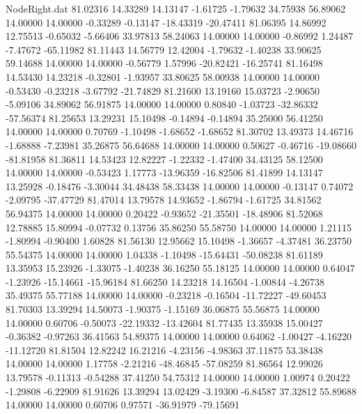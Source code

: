 \begin{filecontents}{NodeRight.dat}
  81.02316   14.33289   14.13147    -1.61725   -1.79632   34.75938   56.89062   14.00000   14.00000   -0.33289   -0.13147  -18.43319  -20.47411
  81.06395   14.86992   12.75513    -0.65032   -5.66406   33.97813   58.24063   14.00000   14.00000   -0.86992    1.24487   -7.47672  -65.11982
  81.11443   14.56779   12.42004    -1.79632   -1.40238   33.90625   59.14688   14.00000   14.00000   -0.56779    1.57996  -20.82421  -16.25741
  81.16498   14.53430   14.23218    -0.32801   -1.93957   33.80625   58.00938   14.00000   14.00000   -0.53430   -0.23218   -3.67792  -21.74829
  81.21600   13.19160   15.03723    -2.90650   -5.09106   34.89062   56.91875   14.00000   14.00000    0.80840   -1.03723  -32.86332  -57.56374
  81.25653   13.29231   15.10498    -0.14894   -0.14894   35.25000   56.41250   14.00000   14.00000    0.70769   -1.10498   -1.68652   -1.68652
  81.30702   13.49373   14.46716    -1.68888   -7.23981   35.26875   56.64688   14.00000   14.00000    0.50627   -0.46716  -19.08660  -81.81958
  81.36811   14.53423   12.82227    -1.22332   -1.47400   34.43125   58.12500   14.00000   14.00000   -0.53423    1.17773  -13.96359  -16.82506
  81.41899   14.13147   13.25928    -0.18476   -3.30044   34.48438   58.33438   14.00000   14.00000   -0.13147    0.74072   -2.09795  -37.47729
  81.47014   13.79578   14.93652    -1.86794   -1.61725   34.81562   56.94375   14.00000   14.00000    0.20422   -0.93652  -21.35501  -18.48906
  81.52068   12.78885   15.80994    -0.07732    0.13756   35.86250   55.58750   14.00000   14.00000    1.21115   -1.80994   -0.90400    1.60828
  81.56130   12.95662   15.10498    -1.36657   -4.37481   36.23750   55.54375   14.00000   14.00000    1.04338   -1.10498  -15.64431  -50.08238
  81.61189   13.35953   15.23926    -1.33075   -1.40238   36.16250   55.18125   14.00000   14.00000    0.64047   -1.23926  -15.14661  -15.96184
  81.66250   14.23218   14.16504    -1.00844   -4.26738   35.49375   55.77188   14.00000   14.00000   -0.23218   -0.16504  -11.72227  -49.60453
  81.70303   13.39294   14.50073    -1.90375   -1.15169   36.06875   55.56875   14.00000   14.00000    0.60706   -0.50073  -22.19332  -13.42604
  81.77435   13.35938   15.00427    -0.36382   -0.97263   36.41563   54.89375   14.00000   14.00000    0.64062   -1.00427   -4.16220  -11.12720
  81.81504   12.82242   16.21216    -4.23156   -4.98363   37.11875   53.38438   14.00000   14.00000    1.17758   -2.21216  -48.46845  -57.08259
  81.86564   12.99026   13.79578    -0.11313   -0.54288   37.41250   54.75312   14.00000   14.00000    1.00974    0.20422   -1.29808   -6.22909
  81.91626   13.39294   13.02429    -3.19300   -6.84587   37.32812   55.89688   14.00000   14.00000    0.60706    0.97571  -36.91979  -79.15691

\end{filecontents}
